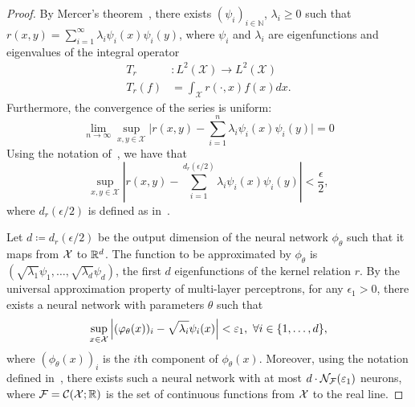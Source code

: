 \begin{proof}
	By Mercer's theorem~\parencite{mercerFunctionsPositive1909, sunMercerTheorem2005, micchelliUniversalKernels2006}, there exists \((\psi_i)_{i \in \mathbb{N}}\), \(\lambda_i \geq 0\) such that \(r(x,y) = \sum_{i=1}^{\infty}{\lambda_i \psi_i(x) \psi_i(y)}\), where \(\psi_i\) and \(\lambda_i\) are eigenfunctions and eigenvalues of the integral operator
	\begin{align*}
		T_r&: L^2(\mathcal{X}) \to L^2(\mathcal{X}) \\
		T_r(f) &= \int_{\mathcal{X}}{r(\cdot, x) f(x) dx}.
	\end{align*}
	Furthermore, the convergence of the series is uniform:
	\begin{equation}
		\lim_{n \to \infty} \sup_{x,y \in \mathcal{X}} \lvert r(x,y) - \sum_{i=1}^{n}{\lambda_i \psi_i(x) \psi_i(y) \rvert} = 0
	\end{equation}
	Using the notation of~, we have that
	\begin{equation}\label{eq:proof_mercer_thm_unif_abs_cv}
		\sup_{x,y \in \mathcal{X}} \left\lvert r(x,y) - \sum_{i=1}^{d_r(\epsilon/2)}{\lambda_i \psi_i(x) \psi_i(y)} \right\rvert < \frac{\epsilon}{2},
	\end{equation}
	where $d_r(\epsilon/2)$ is defined as in~.

	Let $d \coloneqq d_r(\epsilon / 2)$ be the output dimension of the neural network \(\phi_\theta\) such that it maps from ${\mathcal{X}}$ to $\mathbb{R}^d$. The function to be approximated by $\phi_\theta$ is \((\sqrt{\lambda_1} \psi_1, \ldots, \sqrt{\lambda_{d}} \psi_{d})\), the first $d$ eigenfunctions of the kernel relation $r$. By the universal approximation property of multi-layer perceptrons, for any \(\epsilon_1 > 0\), there exists a neural network with parameters \(\theta\) such that
	\begin{equation}\label{eq:proof_NN_UAP}
		\sup_{x\in \mathcal{X}}{\abs{(\phi_\theta(x))_i - \sqrt{\lambda_i} \psi_i(x)}} < \epsilon_1, \ \forall i \in \{1, \ldots, d\},
	\end{equation}
	where $(\phi_\theta(x))_i$ is the \(i\)th component of $\phi_\theta(x)$. Moreover, using the notation defined in~, there exists such a neural network with at most $d \cdot {\mathcal{N}}_{\mathcal{F}}(\varepsilon_1)$ neurons, where ${\mathcal{F}} = {\mathcal{C}}({\mathcal{X}}; \mathbb{R})$ is the set of continuous functions from ${\mathcal{X}}$ to the real line. %


\end{proof}
